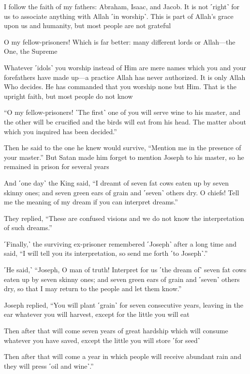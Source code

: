 I follow the faith of my fathers: Abraham, Isaac, and Jacob. It is not ˹right˺ for us to associate anything with Allah ˹in worship˺. This is part of Allah’s grace upon us and humanity, but most people are not grateful

O my fellow-prisoners! Which is far better: many different lords or Allah—the One, the Supreme

Whatever ˹idols˺ you worship instead of Him are mere names which you and your forefathers have made up—a practice Allah has never authorized. It is only Allah Who decides. He has commanded that you worship none but Him. That is the upright faith, but most people do not know

“O my fellow-prisoners! ˹The first˺ one of you will serve wine to his master, and the other will be crucified and the birds will eat from his head. The matter about which you inquired has been decided.”

Then he said to the one he knew would survive, “Mention me in the presence of your master.” But Satan made him forget to mention Joseph to his master, so he remained in prison for several years

And ˹one day˺ the King said, “I dreamt of seven fat cows eaten up by seven skinny ones; and seven green ears of grain and ˹seven˺ others dry. O chiefs! Tell me the meaning of my dream if you can interpret dreams.”

They replied, “These are confused visions and we do not know the interpretation of such dreams.”

˹Finally,˺ the surviving ex-prisoner remembered ˹Joseph˺ after a long time and said, “I will tell you its interpretation, so send me forth ˹to Joseph˺.”

˹He said,˺ “Joseph, O man of truth! Interpret for us ˹the dream of˺ seven fat cows eaten up by seven skinny ones; and seven green ears of grain and ˹seven˺ others dry, so that I may return to the people and let them know.”

Joseph replied, “You will plant ˹grain˺ for seven consecutive years, leaving in the ear whatever you will harvest, except for the little you will eat

Then after that will come seven years of great hardship which will consume whatever you have saved, except the little you will store ˹for seed˺

Then after that will come a year in which people will receive abundant rain and they will press ˹oil and wine˺.”

